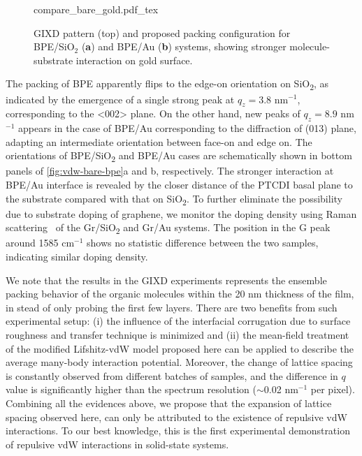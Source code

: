 \begin{figure}[!htbp]
  \centering{}
  {compare_bare_gold.pdf_tex}
  \caption{\label{fig:vdw-bare-bpe} %
    GIXD pattern (top) and proposed packing configuration for
    BPE/SiO$_{2}$ (\textbf{a}) and BPE/Au (\textbf{b}) systems,
    showing stronger molecule-substrate interaction on gold surface.}
\end{figure}
%
The packing of BPE apparently flips to the edge-on orientation on
SiO\textsubscript{2}, as indicated by the emergence of a single strong
peak at $q_{z}=3.8$ nm$^{-1}$, corresponding to the <002>
plane.
%
On the other hand, new peaks of $q_{z}=8.9$ nm$^{-1}$ appears in the
case of BPE/Au corresponding to the diffraction of (013) plane,
adapting an intermediate orientation between face-on and edge on.
%
The orientations of BPE/SiO\textsubscript{2} and BPE/Au cases are
schematically shown in bottom panels of \autoref{fig:vdw-bare-bpe}a
and b, respectively.
%
The stronger interaction at BPE/Au interface is revealed by the closer
distance of the PTCDI basal plane to the substrate compared with that
on SiO\textsubscript{2}.
%
To further eliminate the possibility due to substrate doping of
graphene, we monitor the doping density using Raman scattering~\cite{Das_2008_doping} of the
Gr/SiO\textsubscript{2} and Gr/Au systems.
%
The position in the G peak around 1585 cm$^{-1}$ shows no statistic
difference between the two samples, indicating similar doping density.

We note that the results in the GIXD experiments represents the
ensemble packing behavior of the organic molecules within the 20 nm
thickness of the film, in stead of only probing the first few layers.
%
There are two benefits from such experimental setup: (i) the influence
of the interfacial corrugation due to surface roughness and transfer
technique is minimized and (ii) the mean-field treatment of the
modified Lifshitz-vdW model proposed here can be applied to describe
the average many-body interaction potential.
%
Moreover, the change of lattice spacing is constantly observed from
different batches of samples, and the difference in $q$ value is
significantly higher than the spectrum resolution ($\sim{}$0.02
nm$^{-1}$ per pixel).
%
Combining all the evidences above, we propose that the expansion of
lattice spacing observed here, can only be attributed to the existence
of repulsive vdW interactions.
%
To our best knowledge, this is the first experimental demonstration of
repulsive vdW interactions in solid-state systems.

